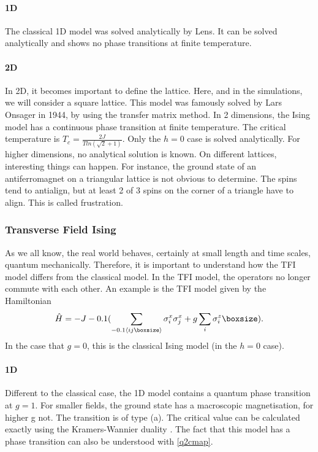 \paragraph{1D}

The classical 1D model was solved analytically by Lens. It can be solved analytically and shows no phase transitions  at finite temperature.

\paragraph{2D}

In 2D, it becomes important to define the lattice. Here, and in the simulations, we will consider a square lattice. This model was famously solved by Lars Onsager in 1944, by using the transfer matrix method. In 2 dimensions, the Ising model has a continuous phase transition at finite temperature. The critical temperature is $T_c = \frac{2 J}{T ln( \sqrt{2}+1)}$. Only the $h=0$ case is solved analytically. For higher dimensions, no analytical solution is known. On different lattices, interesting things can happen. For instance, the ground state of an antiferromagnet on a triangular lattice is not obvious to determine. The spins tend to antialign, but at least 2 of 3 spins on the corner of a triangle have to align. This is called frustration.

\subsubsection{Transverse Field Ising}

As we all know, the real world behaves, certainly at small length and time scales, quantum mechanically. Therefore, it is important to understand how the \acrfull{TFI} model differs from the classical model. In the \Gls{TFI} model, the operators no longer commute with each other. An example is the \Gls{TFI} model given by the  Hamiltonian
\begin{equation}
    \hat{H} = -J \left (  \sum_{\Braket{i j }} \sigma^x_i \sigma^x_j + g \sum_i \sigma^z_i \right ) .
\end{equation}
In the case that $g=0$, this is the classical Ising model (in the $h=0$ case).

\paragraph{1D}
Different to the classical case, the 1D model contains a quantum phase transition at $g=1$. For smaller fields, the ground state has a macroscopic magnetisation, for higher g not. The transition is of type  (a). The critical value can be calculated exactly using the Kramers-Wannier duality \cite{Radicevic2018}. The fact that this model has a phase transition can also be understood with \cref{q2cmap}.

